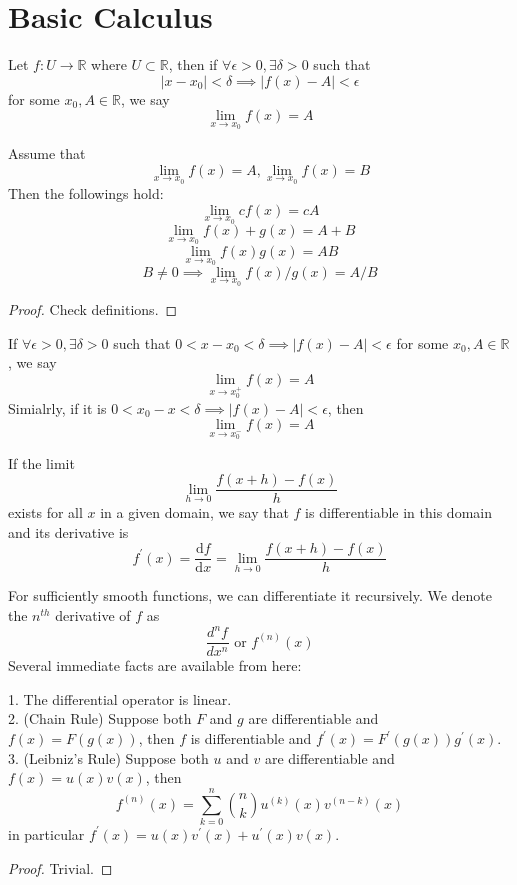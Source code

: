 \section{Basic Calculus}
\begin{definition}
    Let $f:U\to\mathbb R$ where $U\subset\mathbb R$, then if $\forall\epsilon>0,\exists\delta>0$ such that
    $$|x-x_0|<\delta\implies|f(x)-A|<\epsilon$$
    for some $x_0,A\in\mathbb R$, we say
    $$\lim_{x\to x_0}f(x)=A$$
\end{definition}
\begin{theorem}
    Assume that
    $$\lim_{x\to x_0}f(x)=A, \lim_{x\to x_0}f(x)=B$$
    Then the followings hold:
    $$\lim_{x\to x_0}cf(x)=cA$$
    $$\lim_{x\to x_0}f(x)+g(x)=A+B$$
    $$\lim_{x\to x_0}f(x)g(x)=AB$$
    $$B\neq 0\implies\lim_{x\to x_0}f(x)/g(x)=A/B$$
\end{theorem}
\begin{proof}
    Check definitions.
\end{proof}
\begin{definition}
    If $\forall\epsilon>0,\exists\delta>0$ such that $0<x-x_0<\delta\implies|f(x)-A|<\epsilon$
    for some $x_0,A\in\mathbb R$, we say
    $$\lim_{x\to x_0^+}f(x)=A$$
    Simialrly, if it is $0<x_0-x<\delta\implies|f(x)-A|<\epsilon$, then
    $$\lim_{x\to x_0^-}f(x)=A$$
\end{definition}
\begin{definition}
    If the limit
    $$\lim_{h\to0}\frac{f(x+h)-f(x)}{h}$$
    exists for all $x$ in a given domain, we say that $f$ is differentiable in this domain and its derivative is
    $$f^\prime(x)=\frac{\mathrm df}{\mathrm dx}=\lim_{h\to0}\frac{f(x+h)-f(x)}{h}$$
\end{definition}
For sufficiently smooth functions, we can differentiate it recursively.
We denote the $n^{th}$ derivative of $f$ as
$$\frac{d^nf}{dx^n}\text{ or }f^{(n)}(x)$$
Several immediate facts are available from here:
\begin{theorem}
    1. The differential operator is linear.\\
    2. (Chain Rule) Suppose both $F$ and $g$ are differentiable and $f(x)=F(g(x))$,
    then $f$ is differentiable and $f^\prime(x)=F^\prime(g(x))g^\prime(x)$.\\
    3. (Leibniz's Rule) Suppose both $u$ and $v$ are differentiable and $f(x)=u(x)v(x)$, then
    $$f^{(n)}(x)=\sum_{k=0}^n\binom{n}{k}u^{(k)}(x)v^{(n-k)}(x)$$
    in particular $f^\prime(x)=u(x)v^\prime(x)+u^\prime(x)v(x)$.
\end{theorem}
\begin{proof}
    Trivial.
\end{proof}